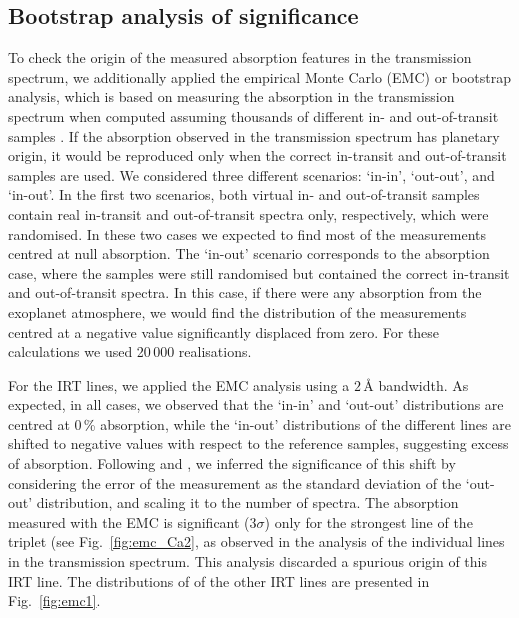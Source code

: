 \documentclass{aa}
\begin{document}
\subsection{Bootstrap analysis of significance}

To check the origin of the measured absorption features in the transmission spectrum, we additionally applied the empirical Monte Carlo (EMC) or bootstrap analysis, which is based on measuring the absorption in the transmission spectrum when computed assuming thousands of different in- and out-of-transit samples \citep{2008Redfield}. 
If the absorption observed in the transmission spectrum has planetary origin, %
it would be reproduced 
only when the correct in-transit and out-of-transit samples are used. 
We considered three different scenarios: `in-in', `out-out', and `in-out'. In the first two scenarios, both virtual in- and out-of-transit samples contain real in-transit and out-of-transit spectra only, respectively, which were randomised. 
In these two cases we expected to find most of the measurements centred at null absorption. The `in-out' scenario corresponds to the absorption case, where the samples were still randomised but contained the correct in-transit and out-of-transit spectra. 
In this case, if there were any absorption from the exoplanet atmosphere, we would find the distribution of the measurements centred at a negative value significantly displaced from zero. For these calculations we used 20\,000 realisations. %

For the  IRT lines, we applied the EMC analysis using a $2$\,{\AA} bandwidth. As expected, in all cases, we observed that the `in-in' and `out-out' distributions are centred at 0\,\% absorption, while the `in-out' distributions of the different lines are shifted to negative values with respect to the reference samples, suggesting excess of absorption. Following \citet{Wytt2015} and \citet{Seidel2019}, we inferred the significance of this shift by considering the error of the measurement as the standard deviation of the `out-out' distribution, and scaling it to the number of spectra. The absorption measured with the EMC is significant ($3\sigma$) only for the strongest line of the triplet (see Fig.~\ref{fig:emc_Ca2}, as observed in the analysis of the individual lines in the transmission spectrum. This analysis discarded a spurious origin of this  IRT line. The distributions of of the other  IRT lines are presented in Fig.~\ref{fig:emc1}.
\end{document}
